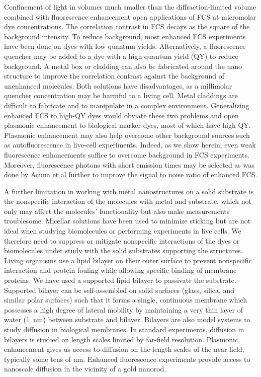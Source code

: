 Confinement of light in volumes much smaller than the diffraction-limited volume combined with fluorescence enhancement open applications of FCS at micromolar dye concentrations.
The correlation contrast in FCS decays as the square of the background intensity.
To reduce background, most enhanced FCS experiments have been done on dyes with low quantum yields.\cite{kinkhabwala2012fluorescence,estrada200810000}
Alternatively, a fluorescence quencher may be added to a dye with a high quantum yield (QY) to reduce background.\cite{punj2013a,punj2013gold}
A metal box or cladding\cite{ghenuche2015matching} can also be fabricated around the nano structure to improve the correlation contrast against the background of unenhanced molecules.
Both solutions have disadvantages, as a millimolar quencher concentration may be harmful to a living cell.
Metal claddings are difficult to fabricate and to manipulate in a complex environment.
Generalizing enhanced FCS to high-QY dyes would obviate these two problems and open plasmonic enhancement to biological marker dyes, most of which have high QY.
Plasmonic enhancement may also help overcome other background sources such as autofluorescence in live-cell experiments.
Indeed, as we show herein, even weak fluorescence enhancements suffice to overcome background in FCS experiments.
Moreover, fluorescence photons with short emission times may be selected as was done by Acuna et al\cite{acuna2012fluorescence} further to improve the signal to noise ratio of enhanced FCS.

A further limitation in working with metal nanostructures on a solid substrate is the nonspecific interaction of the molecules with metal and substrate, which not only may affect the molecules’ functionality but also make measurements troublesome.\cite{kinkhabwala2012fluorescence,yuan2013thousandfold,zhang2009gold}
Micellar solutions have been used to minimize sticking but are not ideal when studying biomolecules or performing experiments in live cells. 
We therefore need to suppress or mitigate nonspecific interactions of the dyes or biomolecules under study with the solid substrates supporting the structures.
Living organisms use a lipid bilayer on their outer surface to prevent nonspecific interaction and protein fouling while allowing specific binding of membrane proteins.\cite{zhang2009gold,cooper2000cell}
We have used a supported lipid bilayer to passivate the substrate.\cite{persson2012lipidbased,ller2012single,lohmuller2011supported}
Supported bilayer can be self-assembled on solid surfaces (glass, silica, and similar polar surfaces) such that it forms a single, 
continuous membrane which possesses a high degree of lateral mobility by maintaining a very thin layer of water (\SI{1}{\nm}) between substrate and bilayer.\cite{sackmann1996supported,CASTELLANA2006429,cremer1999formation,richter2006formation} 
Bilayers are also model systems to study diffusion in biological membranes.
In standard experiments, diffusion in bilayers is studied on length scales limited by far-field resolution. Plasmonic enhancement gives us access to diffusion on the length scales of the near field, typically some tens of nm.
Enhanced fluorescence experiments provide access to nanoscale diffusion in the vicinity of a gold nanorod.

